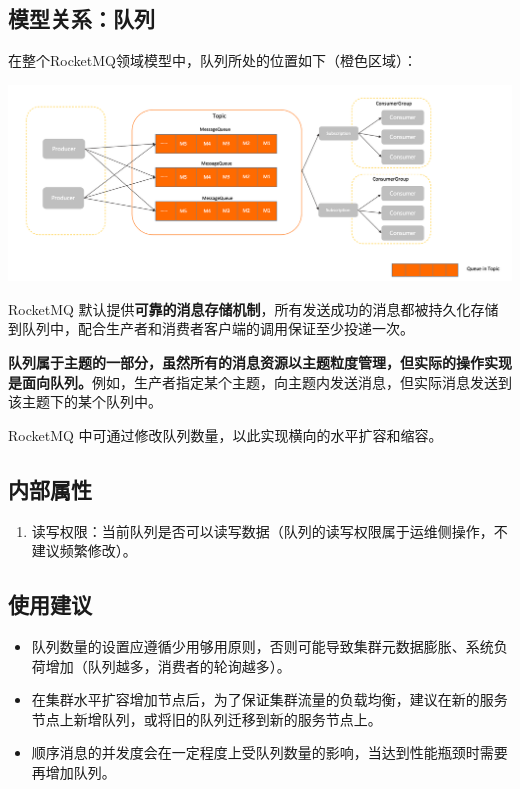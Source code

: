\documentclass[11pt, a4paper, oneside, fontset=none]{ctexbook}
\begin{document}
\subsection{模型关系：队列}
在整个RocketMQ领域模型中，队列所处的位置如下（橙色区域）：

\begin{center}
  \begin{minipage}{\textwidth}
    \center
    \includegraphics[width=\textwidth]{picture/模型关系：队列.png}
    \captionsetup{hypcap=false}
    \label{fig:模型关系：队列}
  \end{minipage}
\end{center}

RocketMQ 默认提供{\bfseries\kaishu 可靠的消息存储机制}，所有发送成功的消息都被持久化存储到队列中，配合生产者和消费者客户端的调用保证至少投递一次。

\textbf{队列属于主题的一部分，虽然所有的消息资源以主题粒度管理，但实际的操作实现是面向队列。}例如，生产者指定某个主题，向主题内发送消息，但实际消息发送到该主题下的某个队列中。

RocketMQ 中可通过修改队列数量，以此实现横向的水平扩容和缩容。

\subsection{内部属性}
\begin{enumerate}
  \item 读写权限：当前队列是否可以读写数据（队列的读写权限属于运维侧操作，不建议频繁修改）。
\end{enumerate}

\subsection{使用建议}
\begin{itemize}
  \item 队列数量的设置应遵循少用够用原则，否则可能导致集群元数据膨胀、系统负荷增加（队列越多，消费者的轮询越多）。
  \item 在集群水平扩容增加节点后，为了保证集群流量的负载均衡，建议在新的服务节点上新增队列，或将旧的队列迁移到新的服务节点上。
  \item 顺序消息的并发度会在一定程度上受队列数量的影响，当达到性能瓶颈时需要再增加队列。
\end{itemize}
\end{document}
